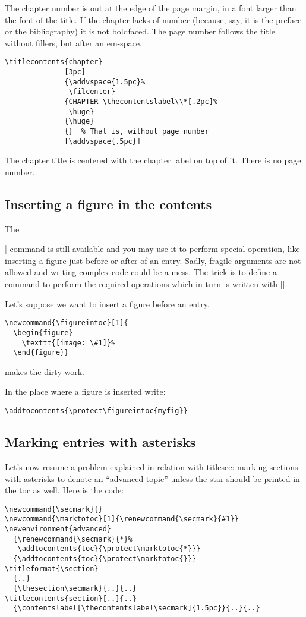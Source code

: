 \documentclass[a4paper]{ltxguide}
\begin{document}
The chapter number is out at the edge of the page margin, in a font
larger than the font of the title. If the chapter lacks of number
(because, say, it is the preface or the bibliography) it is not
boldfaced. The page number follows the title without fillers, but
after an em-space.

\begin{verbatim}
\titlecontents{chapter}
              [3pc]
              {\addvspace{1.5pc}%
               \filcenter}
              {CHAPTER \thecontentslabel\\*[.2pc]%
               \huge}
              {\huge}
              {}  % That is, without page number
              [\addvspace{.5pc}]
\end{verbatim}
              
The chapter title is centered with the chapter label on top
of it. There is no page number.

\subsection{Inserting a figure in the contents}

The |\addtocontents| command is still available and you may use
it to perform special operation, like inserting a figure just before
or after of an entry. Sadly, fragile
arguments are not allowed and writing complex code could be a mess.
The trick is to define a command to perform the required operations
which in turn is written with |\protect|.

Let's suppose we want to insert a figure before an entry.
\begin{verbatim}
\newcommand{\figureintoc}[1]{
  \begin{figure}
    \texttt{[image: \#1]}%
  \end{figure}}
\end{verbatim}
makes the dirty work.

In the place where a figure is inserted write:
\begin{verbatim}
\addtocontents{\protect\figureintoc{myfig}}
\end{verbatim}

\subsection{Marking entries with asterisks}

Let's now resume a problem explained in relation with
\textsf{titlesec}: marking sections with asterisks to
denote an ``advanced topic'' unless the star should
be printed in the toc as well. Here is the code:
\begin{verbatim}
\newcommand{\secmark}{}
\newcommand{\marktotoc}[1]{\renewcommand{\secmark}{#1}}
\newenvironment{advanced}
  {\renewcommand{\secmark}{*}%
   \addtocontents{toc}{\protect\marktotoc{*}}}
  {\addtocontents{toc}{\protect\marktotoc{}}}
\titleformat{\section}
  {..}
  {\thesection\secmark}{..}{..}
\titlecontents{section}[..]{..}
  {\contentslabel[\thecontentslabel\secmark]{1.5pc}}{..}{..}
\end{verbatim}
\end{document}
